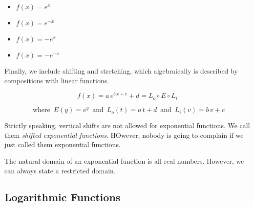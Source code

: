\documentclass{ximera}
\begin{document}
\begin{template}
\begin{itemize}
\item $f(x) = e^x$ 
\item $f(x) = e^{-x}$ 
\item $f(x) = -e^x$ 
\item $f(x) = -e^{-x}$ 
\end{itemize}






Finally, we include shifting and stretching, which algebraically is described by compositions with linear functions.


\[ f(x) = a \, e^{b \, x + c} + d = L_o \circ E \circ L_i\]

\[
\text{ where } \,  E(y) = e^y   \,  \text{ and } \,   L_o(t) = a \, t + d    \,  \text{ and } \,   L_i(v) = b \, v + c
\]



Strictly speaking, vertical shifts are not allowed for exponential functions.  We call them \textit{shifted exponential functions}.  HOwever, nobody is going to complain if we just called them exponential functions.






\end{template}





The natural domain of an exponential function is all real numbers.  However, we can always state a restricted domain. \\









\subsection{Logarithmic Functions}
\end{document}
